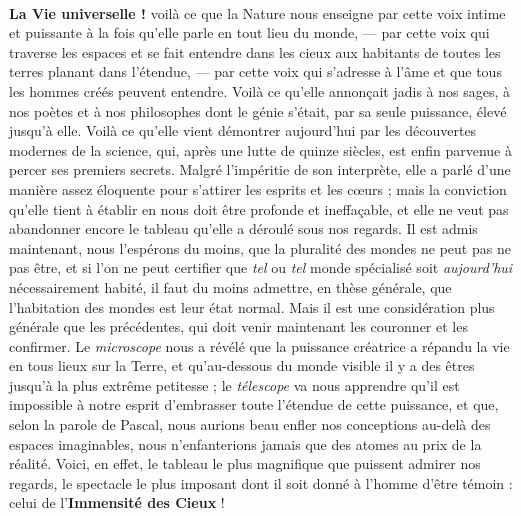 \documentclass[a4paper, 11pt, oneside]{article}
\begin{document}
\paragraph{}
\textbf{La Vie universelle !} voilà ce que la Nature nous enseigne par cette voix intime et puissante à la fois qu'elle parle en tout lieu du monde, --- par cette voix qui traverse les espaces et se fait entendre dans les cieux aux habitants de toutes les terres planant dans l'étendue, --- par cette voix qui s'adresse à l'âme et que tous les hommes créés peuvent entendre. Voilà ce qu'elle annonçait jadis à nos sages, à nos poètes et à nos philosophes dont le génie s'était, par sa seule puissance, élevé jusqu'à elle. Voilà ce qu'elle vient démontrer aujourd'hui par les découvertes modernes de la science, qui, après une lutte de quinze siècles, est enfin parvenue à percer ses premiers secrets. Malgré l'impéritie de son interprète, elle a parlé d'une manière assez éloquente pour s'attirer les esprits et les cœurs ; mais la conviction qu'elle tient à établir en nous doit être profonde et ineffaçable, et elle ne veut pas abandonner encore le tableau qu'elle a déroulé sous nos regards. Il est admis maintenant, nous l'espérons du moins, que la pluralité des mondes ne peut pas ne pas être, et si l'on ne peut certifier que \emph{tel} ou \emph{tel} monde spécialisé soit \emph{aujourd'hui} nécessairement habité, il faut du moins admettre, en thèse générale, que l'habitation des mondes est leur état normal. Mais il est une considération plus générale que les précédentes, qui doit venir maintenant les couronner et les confirmer. Le \emph{microscope} nous a révélé que la puissance créatrice a répandu la vie en tous lieux sur la Terre, et qu'au-dessous du monde visible il y a des êtres jusqu'à la plus extrême petitesse ; le \emph{télescope} va nous apprendre qu'il est impossible à notre esprit d'embrasser toute l'étendue de cette puissance, et que, selon la parole de Pascal, nous aurions beau enfler nos conceptions au-delà des espaces imaginables, nous n'enfanterions jamais que des atomes au prix de la réalité. Voici, en effet, le tableau le plus magnifique que puissent admirer nos regards, le spectacle le plus imposant dont il soit donné à l'homme d'être témoin : celui de l'\textbf{Immensité des Cieux} !
\end{document}
